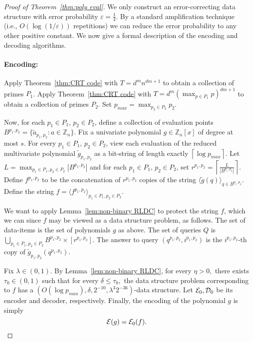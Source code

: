 \documentclass[11pt,english]{article}
\theoremstyle{definition}
\theoremstyle{remark}
\newcommand{\eps}{\varepsilon}
\newcommand{\D}{{\cal D}}
\newcommand{\E}{{\cal E}}
\newcommand{\Z}{\mathbb{Z}}
\begin{document}
\begin{proof}[Proof of Theorem~\ref{thm:poly eval}]We only construct
an error-correcting data structure with error probability $\eps=\frac{1}{4}$.
By a standard amplification technique (i.e., $O(\log(1/\eps))$ repetitions)
we can reduce the error probability to any other positive constant.
We now give a formal description of the encoding and decoding algorithms.

\paragraph{\textbf{Encoding:}}
Apply Theorem~\ref{thm:CRT code} with $T=d^{m}n^{dm+1}$ to obtain a collection of primes $P_1$.
Apply Theorem~\ref{thm:CRT code} with $T=d^{m}(\max_{p\in P_{1}}p)^{dm+1}$ to obtain a collection of primes $P_2$. 
Set $p_{max}=\max_{p_{2}\in P_{2}}p_{2}$. 

Now, for each $p_1\in P_1$, $p_2 \in P_2$, define a collection of evaluation points $B^{p_{1},p_{2}}=\{\tilde{a}_{p_{1},p_{2}}:a\in\Z_{n}\}$. 
Fix a univariate polynomial $g\in\Z_{n}[x]$ of degree at most $s$. 
For every $p_{1}\in P_{1}$, $p_{2}\in P_{2}$,
view each evaluation of the reduced multivariate polynomial $\tilde{g}_{p_{1},p_{2}}$
as a bit-string of length exactly $\left\lceil \log p_{max}\right\rceil $.
Let $L=\max_{p_{1}\in P_1, p_{2}\in P_2}|B^{p_{1},p_{2}}|$ and for each $p_1\in P_1$, $p_2 \in P_2$, set $r^{p_{1},p_{2}}=\left\lceil \frac{L}{|B^{p_{1},p_{2}}|}\right\rceil.$
Define $f^{p_{1},p_{2}}$ to be the concatenation of $r^{p_{1},p_{2}}$ copies of 
the string $\langle\tilde{g}(q)\rangle_{q\in B^{p_{1},p_{2}}}$.
Define the string $f=\langle f^{p_{1},p_{2}}\rangle_{p_{1}\in P_1,p_{2}\in P_2}.$ 

We want to apply Lemma~\ref{lem:non-binary RLDC} to protect the
string $f$, which we can since $f$ may be viewed as a data structure
problem, as follows. 
The set of data-items is the set of polynomials $g$ as above.
The set of queries $Q$ is $\bigcup\limits_{p_{1}\in P_{1},p_2\in P_2}B^{p_{1},p_{2}}\times [r^{p_{1},p_{2}}]$.
The answer to query $(q^{p_{1},p_{2}},i^{p_{1},p_{2}})$
is the $i^{p_{1},p_{2}}$-th copy of $\tilde{g}_{p_{1},p_{2}}(q^{p_{1},p_{2}})$.

Fix $\lambda \in (0,1)$. By Lemma~\ref{lem:non-binary RLDC},
for every $\eta>0,$ there exists $\tau_{0}\in(0,1)$ such that for every $\delta\leq\tau_{0},$
the data structure problem corresponding to $f$ has a $(O(\log p_{max}),\delta,2^{-10},\lambda^3 2^{-36})$-data
structure. Let $\E_{0},\D_{0}$ be its encoder and decoder, respectively. 
Finally, the encoding of the polynomial $g$ is simply \[
\E(g)=\E_{0}(f).\]


\end{proof}
\end{document}
